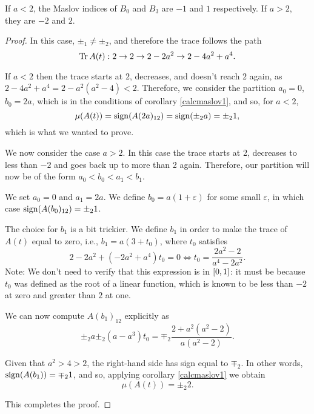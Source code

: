\begin{prop}
If $a < 2$, the Maslov indices of $B_0$ and $B_3$ are $-1$ and $1$ respectively. If $a > 2$, they are $-2$ and $2$.
\end{prop}

\begin{proof}
In this case, $\pm_1 \neq \pm_2$, and therefore the trace follows the path
\begin{equation}
\operatorname{Tr} A(t) : 2 \to 2 \to 2 - 2a^2 \to 2 - 4a^2 + a^4.
\end{equation}

If $a<2$ then the trace starts at $2$, decreases, and doesn't reach $2$ again, as $2 - 4a^2 + a^4 = 2 - a^2 (a^2 - 4) < 2$. Therefore, we consider the partition $a_0 = 0$, $b_0 = 2a$, which is in the conditions of corollary \ref{calcmaslov1}, and so, for $a<2$,
\begin{equation}
\mu(A(t)) = \operatorname{sign}(A(2a)_{12}) = \operatorname{sign}(\pm_2 a) = \pm_2 1,
\end{equation}
which is what we wanted to prove.

\smallskip

We now consider the case $a > 2$. In this case the trace starts at 2, decreases to less than $-2$ and goes back up to more than 2 again. Therefore, our partition will now be of the form $a_0 < b_0 < a_1 < b_1$.

We set $a_0 = 0$ and $a_1 = 2a$. We define $b_0 = a(1+\varepsilon)$ for some small $\varepsilon$, in which case $\operatorname{sign}(A(b_0)_{12}) = \pm_2 1$.

The choice for $b_1$ is a bit trickier. We define $b_1$ in order to make the trace of $A(t)$ equal to zero, i.e., $b_1 = a(3 + t_0)$, where $t_0$ satisfies
\begin{equation}
2 - 2a^2 + (-2a^2 + a^4)t_0 = 0 \iff t_0 = \frac{2a^2 - 2}{a^4 - 2a^2}.
\end{equation}
Note: We don't need to verify that this expression is in $\interval 0 1$: it must be because $t_0$ was defined as the root of a linear function, which is known to be less than $-2$ at zero and greater than $2$ at one.

We can now compute $A(b_1)_{12}$ explicitly as
\begin{equation}
\pm_2 a \pm_2 (a - a^3) t_0 = \mp_2 \frac{2 + a^2(a^2 - 2)}{a(a^2 - 2)}.
\end{equation}

Given that $a^2 > 4 > 2$, the right-hand side has sign equal to $\mp_2$. In other words, $\operatorname{sign}(A(b_1)) = \mp_2 1$, and so, applying corollary \ref{calcmaslov1} we obtain
\begin{equation}
\mu(A(t)) = \pm_2 2.
\end{equation}

This completes the proof.
\end{proof}

